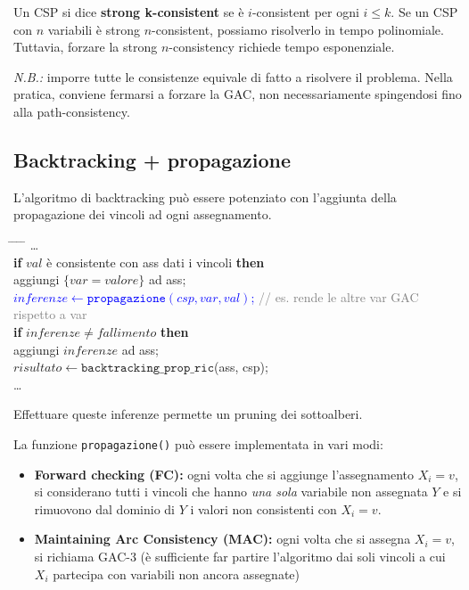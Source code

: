 \documentclass[a4paper,11pt]{report}
\begin{document}
Un CSP si dice \textbf{strong k-consistent} se è $i$-consistent per ogni $i \le k$. Se un CSP con $n$ variabili è strong $n$-consistent, possiamo risolverlo in tempo polinomiale.
Tuttavia, forzare la strong $n$-consistency richiede tempo esponenziale. 

\begin{gframe}{}
\textit{N.B.:} imporre tutte le consistenze equivale di fatto a risolvere il problema. Nella pratica, conviene fermarsi a forzare la GAC, non necessariamente spingendosi fino alla path-consistency.
\end{gframe}

\subsection{Backtracking + propagazione}
L'algoritmo di backtracking può essere potenziato con l'aggiunta della propagazione dei vincoli ad ogni assegnamento. 

\begin{tcolorbox}[colback=gray!10, colframe=gray!10, arc=4pt, boxrule=0pt, left=5pt, right=5pt, top=5pt, bottom=5pt]
    \begin{tabbing}
        \hspace{0.5cm} \= \hspace{0.5cm} \= \hspace{0.5cm} \= \hspace{0.5cm} \= \kill
        \dots \\
        \> \textbf{if} $val$ è consistente con ass dati i vincoli \textbf{then} \\
        \> \> aggiungi $\{var = valore\}$ ad ass; \\
        \> \> \textcolor{blue}{$inferenze \leftarrow \texttt{propagazione}(csp, var, val)$;} \textcolor{gray}{// es. rende le altre var GAC rispetto a var} \\
        \> \> \textbf{if} $inferenze \neq fallimento$ \textbf{then} \\
        \> \> \> aggiungi $inferenze$ ad ass; \\
        \> \> \> $risultato \leftarrow \texttt{backtracking\_prop\_ric}$(ass, csp); \\
        \dots
    \end{tabbing}
\end{tcolorbox}

Effettuare queste inferenze permette un pruning dei sottoalberi. 

La funzione \texttt{propagazione()} può essere implementata in vari modi:
\begin{itemize}
    \item \textbf{Forward checking (FC):} ogni volta che si aggiunge l'assegnamento $X_i = v$, si considerano tutti i vincoli che hanno \textit{una sola} variabile non assegnata $Y$ e si rimuovono dal dominio di $Y$ i valori non consistenti con $X_i=v$.
    \item \textbf{Maintaining Arc Consistency (MAC):} ogni volta che si assegna $X_i = v$, si richiama GAC-3 (è sufficiente far partire l'algoritmo dai soli vincoli a cui $X_i$ partecipa con variabili non ancora assegnate)
\end{itemize}
\end{document}
